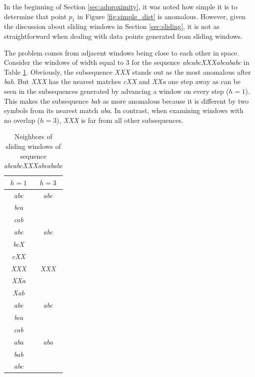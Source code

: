 In the beginning of Section \ref{sec:adproximity}, it was noted how simple it is to determine that point $p_1$ in Figure \ref{fig:simple_dist} is anomalous. However, given the discussion about sliding windows in Section \ref{sec:sliding}, it is not as straightforward when dealing with data points generated from sliding windows.

The problem comes from adjacent windows being close to each other in space. Consider the windows of width equal to 3 for the sequence \emph{abcabcXXXabcababc} \cite{Keogh2005} in Table \ref{tbl:selfmatch}. Obviously, the subsequence \emph{XXX} stands out as the most anomalous after \emph{bab}. But \emph{XXX} has the nearest matches \emph{cXX} and \emph{XXa} one step away as can be seen in the subsequences generated by advancing a window on every step ($h=1$). This makes the subsequence \emph{bab} as more anomalous because it is different by two symbols from its nearest match \emph{aba}. In contrast, when examining windows with no overlap ($h=3$), \emph{XXX} is far from all other subsequences.

\begin{table}[h]
  \centering
  \caption[Neighbors of sliding windows]{Neighbors of sliding windows of sequence \emph{abcabcXXXabcababc}}
  \begin{tabular}{|c||c|}
    \hline
    $h=1$ & $h=3$ \\
    \hline
    \hline
    \emph{abc} & \emph{abc} \\
    \emph{bca} & \\
    \emph{cab} & \\
    \hline
    \emph{abc} & \emph{abc} \\
    \emph{bcX} & \\
    \emph{cXX} & \\
    \hline
    \emph{XXX} & \emph{XXX} \\
    \emph{XXa} & \\
    \emph{Xab} & \\
    \hline
    \emph{abc} & \emph{abc} \\
    \emph{bca} & \\
    \emph{cab} & \\
    \hline
    \emph{aba} & \emph{aba} \\ 
    \emph{bab} & \\
    \emph{abc} & \\
    \hline
  \end{tabular}
  \label{tbl:selfmatch}
\end{table}

